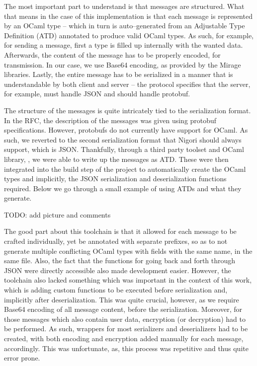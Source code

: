 The most important part to understand is that messages are structured.
What that means in the case of this implementation is that each message is represented by an OCaml type -- which in turn is auto--generated from an Adjustable Type Definition (ATD) annotated to produce valid OCaml types.
As such, for example, for sending a message, first a type is filled up internally with the wanted data.
Afterwards, the content of the message has to be properly encoded, for transmission.
In our case, we use Base64 encoding, as provided by the Mirage libraries.
Lastly, the entire message has to be serialized in a manner that is understandable by both client and server -- the protocol specifies that the server, for example, must handle JSON and should handle protobuf.

The structure of the messages is quite intricately tied to the serialization format.
In the RFC, the description of the messages was given using protobuf specifications.
However, protobufs do not currently have support for OCaml.
As such, we reverted to the second serialization format that Nigori should always support, which is JSON.
Thankfully, through a third party toolset and OCaml library, , we were able to write up the messages as ATD.
These were then integrated into the build step of the project to automatically create the OCaml types and implicitly, the JSON serialization and deserialization functions required.
Below we go through a small example of using ATDs and what they generate.

TODO: add picture and comments

The good part about this toolchain is that it allowed for each message to be crafted individually, yet be annotated with separate prefixes, so as to not generate multiple conflicting OCaml types with fields with the same name, in the same file.
Also, the fact that the functions for going back and forth through JSON were directly accessible also made development easier.
However, the toolchain also lacked something which was important in the context of this work, which is adding custom functions to be executed before serialization and, implicitly after deserialization.
This was quite crucial, however, as we require Base64 encoding of all message content, before the serialization.
Moreover, for those messages which also contain user data, encryption (or decryption) had to be performed.
As such, wrappers for most serializers and deserializers had to be created, with both encoding and encryption added manually for each message, accordingly.
This was unfortunate, as, this process was repetitive and thus quite error prone.

